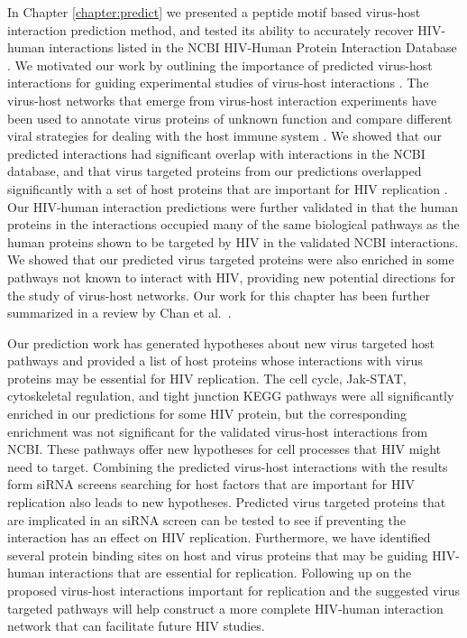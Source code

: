 In Chapter \ref{chapter:predict} we presented a peptide motif based
virus-host interaction prediction method, and tested its ability to
accurately recover HIV-human interactions listed in the NCBI HIV-Human
Protein Interaction Database \cite{fu09,ptak08}. We motivated our work
by outlining the importance of predicted virus-host interactions for
guiding experimental studies of virus-host interactions
\cite{skrabanek2008computational,jansen2003bayesian,lee2004probabilistic}. The
virus-host networks that emerge from virus-host interaction
experiments have been used to annotate virus proteins of unknown
function and compare different viral strategies for dealing with the
host immune system \cite{navratil-system,calderwood07}. We showed that
our predicted interactions had significant overlap with interactions in
the NCBI database, and that virus targeted proteins from our
predictions overlapped significantly with a set of host proteins that
are important for HIV replication \cite{bushman09}. Our HIV-human
interaction predictions were further validated in that the human
proteins in the interactions occupied many of the same biological
pathways as the human proteins shown to be targeted by HIV in the
validated NCBI interactions. We showed that our predicted virus
targeted proteins were also enriched in some pathways not known to interact
with HIV, providing new potential directions for the study of
virus-host networks. Our work for this chapter has been further
summarized in a review by Chan et al.\ \cite{chan09}.

Our prediction work has generated hypotheses about new virus targeted
host pathways and provided a list of host proteins whose interactions
with virus proteins may be essential for HIV replication. The cell
cycle, Jak-STAT, cytoskeletal regulation, and tight junction KEGG
pathways were all significantly enriched in our predictions for some
HIV protein, but the corresponding enrichment was not significant for
the validated virus-host interactions from NCBI. These pathways offer
new hypotheses for cell processes that HIV might need to
target. Combining the predicted virus-host interactions with the
results form siRNA screens searching for host factors that are
important for HIV replication also leads to new hypotheses. Predicted
virus targeted proteins that are implicated in an siRNA screen can be
tested to see if preventing the interaction has an effect on HIV
replication.  Furthermore, we have identified several protein binding
sites on host and virus proteins that may be guiding HIV-human
interactions that are essential for replication. Following up on the
proposed virus-host interactions important for replication and the
suggested virus targeted pathways will help construct a more complete
HIV-human interaction network that can facilitate future HIV studies.

